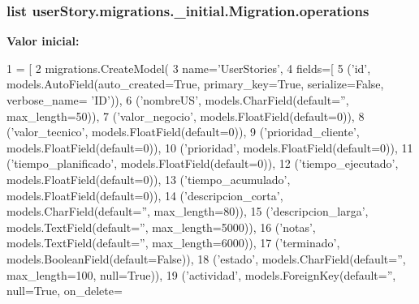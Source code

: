 \subsubsection[{\texorpdfstring{operations}{operations}}]{\setlength{\rightskip}{0pt plus 5cm}list user\+Story.\+migrations.\+\_\+initial.\+Migration.\+operations\hspace{0.3cm}{\ttfamily [static]}}\hypertarget{classuser_story_1_1migrations_1_10001__initial_1_1_migration_af641102b3c30687a6925889fc6665bfd}{}\label{classuser_story_1_1migrations_1_10001__initial_1_1_migration_af641102b3c30687a6925889fc6665bfd}
{\bfseries Valor inicial\+:}
\begin{DoxyCode}
1 = [
2         migrations.CreateModel(
3             name=\textcolor{stringliteral}{'UserStories'},
4             fields=[
5                 (\textcolor{stringliteral}{'id'}, models.AutoField(auto\_created=\textcolor{keyword}{True}, primary\_key=\textcolor{keyword}{True}, serialize=\textcolor{keyword}{False}, verbose\_name=\textcolor{stringliteral}{
      'ID'})),
6                 (\textcolor{stringliteral}{'nombreUS'}, models.CharField(default=\textcolor{stringliteral}{''}, max\_length=50)),
7                 (\textcolor{stringliteral}{'valor\_negocio'}, models.FloatField(default=0)),
8                 (\textcolor{stringliteral}{'valor\_tecnico'}, models.FloatField(default=0)),
9                 (\textcolor{stringliteral}{'prioridad\_cliente'}, models.FloatField(default=0)),
10                 (\textcolor{stringliteral}{'prioridad'}, models.FloatField(default=0)),
11                 (\textcolor{stringliteral}{'tiempo\_planificado'}, models.FloatField(default=0)),
12                 (\textcolor{stringliteral}{'tiempo\_ejecutado'}, models.FloatField(default=0)),
13                 (\textcolor{stringliteral}{'tiempo\_acumulado'}, models.FloatField(default=0)),
14                 (\textcolor{stringliteral}{'descripcion\_corta'}, models.CharField(default=\textcolor{stringliteral}{''}, max\_length=80)),
15                 (\textcolor{stringliteral}{'descripcion\_larga'}, models.TextField(default=\textcolor{stringliteral}{''}, max\_length=5000)),
16                 (\textcolor{stringliteral}{'notas'}, models.TextField(default=\textcolor{stringliteral}{''}, max\_length=6000)),
17                 (\textcolor{stringliteral}{'terminado'}, models.BooleanField(default=\textcolor{keyword}{False})),
18                 (\textcolor{stringliteral}{'estado'}, models.CharField(default=\textcolor{stringliteral}{''}, max\_length=100, null=\textcolor{keyword}{True})),
19                 (\textcolor{stringliteral}{'actividad'}, models.ForeignKey(default=\textcolor{stringliteral}{''}, null=\textcolor{keyword}{True}, on\_delete=

\end{DoxyCode}
